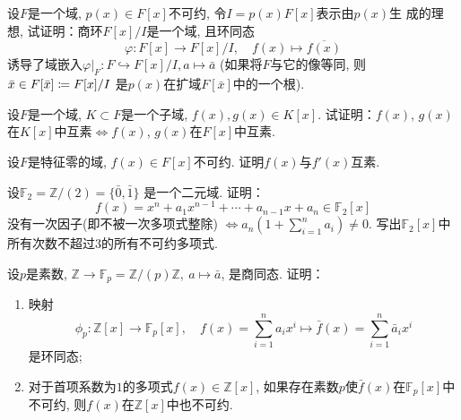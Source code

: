 \begin{problem}
    设$F$是一个域, $p(x) \in F[x]$不可约, 令$I = p(x)F[x]$表示由$p(x)$生
成的理想, 试证明：商环$F[x]/I$是一个域, 且环同态
\[
    \varphi:F[x] \to F[x]/I,\quad f(x) \mapsto \overline{f(x)}
\]
诱导了域嵌入$\varphi|_F: F\hookrightarrow F[x]/I, a \mapsto \bar{a}$
(如果将$F$与它的像等同, 则$\bar{x} \in F[\bar{x}] \mathrel{\coloneqq} F[x]/I$
是$p(x)$在扩域$F[\bar{x}]$中的一个根).
\end{problem}

\begin{solution}
    
\end{solution}

\begin{problem}
    设$F$是一个域, $K \subset F$是一个子域, $f(x), g(x) \in K[x]$.
试证明：$f(x)$, $g(x)$在$K[x]$中互素$\Leftrightarrow f(x)$,
$g(x)$在$F[x]$中互素.
\end{problem}

\begin{solution}
    
\end{solution}

\begin{problem}
    设$F$是特征零的域, $f(x) \in F[x]$不可约. 证明$f(x)$与$f'(x)$互素.
\end{problem}

\begin{solution}
    
\end{solution}

\begin{problem}
    设$\mathbb{F}_2 = \mathbb{Z}/(2) = \{\bar{0}, \bar{1}\}$
是一个二元域. 证明：
\[
    f(x) = x^n + a_1x^{n - 1} + \cdots + a_{n - 1}x + a_n \in \mathbb{F}_2[x]
\]
没有一次因子(即不被一次多项式整除)
\(
    \Leftrightarrow a_n\left(1 + \sum_{i = 1}^n a_i\right) \neq 0.
\)
写出$\mathbb{F}_2[x]$中所有次数不超过$3$的所有不可约多项式.
\end{problem}

\begin{solution}
    
\end{solution}

\begin{problem}
    设$p$是素数, $\mathbb{Z} \to \mathbb{F}_p = \mathbb{Z}/(p)\mathbb{Z},~a \mapsto \bar{a}$,
是商同态. 证明：
\begin{enumerate}[(1)]
    \item 映射
\[
    \phi_p:\mathbb{Z}[x] \to \mathbb{F}_p[x],\quad f(x) = \sum_{i = 1}^n a_ix^i \mapsto \bar{f}(x) = \sum_{i = 1}^n \bar{a}_ix^i
\]
是环同态;
    \item 对于首项系数为$1$的多项式$f(x) \in \mathbb{Z}[x]$,
如果存在素数$p$使$\bar{f}(x)$在$\mathbb{F}_p[x]$中不可约, 
则$f(x)$在$\mathbb{Z}[x]$中也不可约.
\end{enumerate}
\end{problem}

